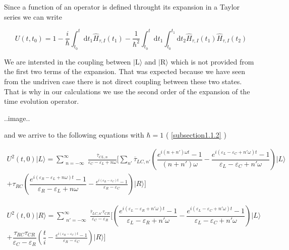  Since a function  of an operator is defined throught its expansion in a Taylor series we can write 

\begin{equation} \label{eq:4}
  U(t,t_{0}) = 1- \frac{i}{\hbar}\int_{t_0}^{t} \mathrm{d}t_1 \widehat{H}_{\tau,I} (t_1) - \frac{1}{\hbar^2}\int_{t_0}^{t} \mathrm{d}t_1 \int_{t_0}^{t_1} \mathrm{d}t_2  \widehat{H}_{\tau,I} (t_1) \widehat{H}_{\tau,I} (t_2)
\end{equation}

We are intersted in the coupling between $\vert$L$\rangle$ and $\vert$R$\rangle$ which is not provided from the first two terms of the expansion. That was expected because we have seen from the undriven case there is not direct coupling between these two states. That is why in our calculations we use the second order of the expansion of the time evolution operator. 

..image..

and we arrive to the following equations with $\hbar=1$ ( \ref{subsection1.1.2} )

\begin{multline} \label{eq:5}
U^{2}(t,0) \vert L \rangle = \sum_{\substack{n=-\infty}}^{\infty} \frac{\overline{\tau}_{CL,n} } { \varepsilon_C -\varepsilon_L + n \omega } [ 
  \sum_{n'} \overline{\tau}_{LC,n'} \left(  \dfrac{ e^{ i (n+n')\omega t } -1}{ ( n+n' ) \omega } - \dfrac{ e^{i ( \varepsilon_L - \varepsilon_C + n'\omega ) t } - 1 } { \varepsilon_L - \varepsilon_C + n'  \omega  } \right)    \vert L \rangle 
\\
+\tau_{RC} \left(  \dfrac{ e^{i ( \varepsilon_R - \varepsilon_L + n \omega )  t } - 1 } { \varepsilon_R - \varepsilon_L + n \omega  } - \frac{ e^{i ( \varepsilon_R - \varepsilon_C )  t } - 1 } { \varepsilon_R - \varepsilon_C } \right)  \vert R \rangle ] 
\end{multline}

\begin{multline} \label{eq:6}
U^{2}(t,0) \vert R \rangle = \sum_{\substack{n'=-\infty}}^{\infty} \frac{\overline{\tau}_{LC,n'} {\tau}_{CR}  } { \varepsilon_C -\varepsilon_R } [ \left(  \dfrac{ e^{i ( \varepsilon_L - \varepsilon_R + n'\omega ) t } - 1 } { \varepsilon_L - \varepsilon_R + n'  \omega  } - \dfrac{ e^{i ( \varepsilon_L - \varepsilon_C + n'\omega ) t } - 1 } { \varepsilon_L - \varepsilon_C + n'  \omega  } \right)    \vert L \rangle 
\\
+ \dfrac{ \tau_{RC} \tau_{CR} }{ \varepsilon_C - \varepsilon_R } \left(  \dfrac{t}{i}- \frac{ e^{i ( \varepsilon_R - \varepsilon_C )  t } - 1 } { \varepsilon_R - \varepsilon_C } \right)  \vert R \rangle ] 
\end{multline}


